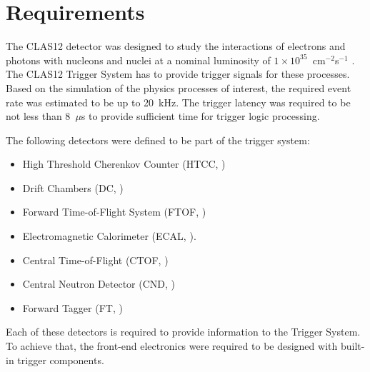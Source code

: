 \section{Requirements}

The CLAS12 detector was designed to study the interactions of electrons and photons with nucleons and nuclei at a nominal luminosity of $1\times 10^{35}$~cm$^{-2}$s$^{-1}$ \cite{clas12-nim}. The CLAS12 Trigger System has to provide trigger signals for these processes. Based on the simulation of the physics processes of interest, the required event rate was estimated to be up to 20~kHz. The trigger latency was required to be not less than 8~$\mu$s to provide sufficient time for trigger logic processing.


The following detectors were defined to be part of the trigger system:

\begin{itemize}
	\item High Threshold Cherenkov Counter (HTCC, \cite{htcc-ref})
	\item Drift Chambers (DC, \cite{dc-ref})
	\item Forward Time-of-Flight System (FTOF, \cite{ftof-ref})
	\item Electromagnetic Calorimeter (ECAL, \cite{ec-ref}).
	\item Central Time-of-Flight (CTOF, \cite{ctof-ref})
	\item Central Neutron Detector (CND, \cite{cnd-ref})
	\item Forward Tagger (FT, \cite{ft-ref})
\end{itemize}

Each of these detectors is required to provide information to the Trigger System. To achieve that, the front-end electronics were required to be designed with built-in trigger components. 

 
